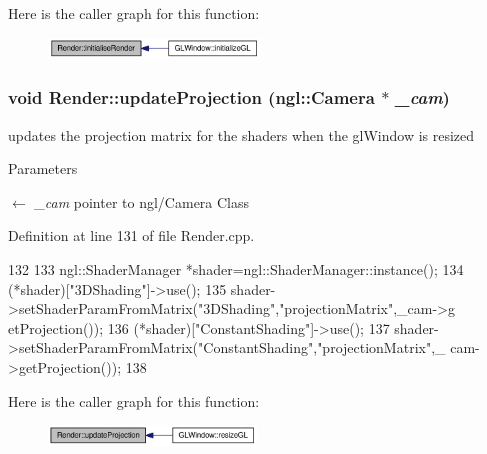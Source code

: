 Here is the caller graph for this function:\nopagebreak
\begin{figure}[H]
\begin{center}
\leavevmode
\includegraphics[width=159pt]{class_render_a52ff4b4560ad5ef64c8babfc2132e7c0_icgraph}
\end{center}
\end{figure}


\hypertarget{class_render_adee537ebd2b8e1e06163d8021d7f0e67}{
\subsubsection[{updateProjection}]{\setlength{\rightskip}{0pt plus 5cm}void Render::updateProjection (ngl::Camera $\ast$ {\em \_\-cam})}}
\label{class_render_adee537ebd2b8e1e06163d8021d7f0e67}


updates the projection matrix for the shaders when the glWindow is resized 


\begin{DoxyParams}{Parameters}
\item[\mbox{$\leftarrow$} {\em \_\-cam}]pointer to ngl/Camera Class \end{DoxyParams}


Definition at line 131 of file Render.cpp.




\begin{DoxyCode}
132 {
133     ngl::ShaderManager *shader=ngl::ShaderManager::instance();
134     (*shader)["3DShading"]->use();
135           shader->setShaderParamFromMatrix("3DShading","projectionMatrix",_cam->g
      etProjection());
136     (*shader)["ConstantShading"]->use();
137           shader->setShaderParamFromMatrix("ConstantShading","projectionMatrix",_
      cam->getProjection());
138 }
\end{DoxyCode}




Here is the caller graph for this function:\nopagebreak
\begin{figure}[H]
\begin{center}
\leavevmode
\includegraphics[width=157pt]{class_render_adee537ebd2b8e1e06163d8021d7f0e67_icgraph}
\end{center}
\end{figure}




